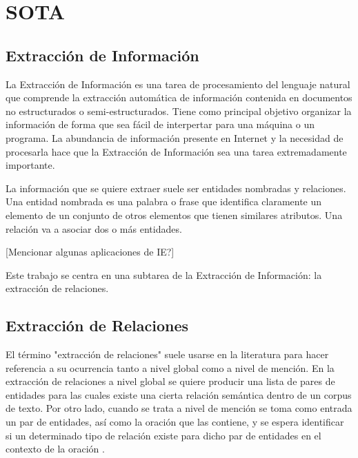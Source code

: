 
\chapter{SOTA}
\section{Extracción de Información}

La Extracción de Información es una tarea de procesamiento del lenguaje natural que comprende la extracción automática de información contenida en documentos no estructurados o semi-estructurados. Tiene como principal objetivo organizar la información de forma que sea fácil de interpertar para una máquina o un programa. La abundancia de información presente en Internet y la necesidad de procesarla hace que la Extracción de Información sea una tarea extremadamente importante. 


La información que se quiere extraer suele ser entidades nombradas y relaciones. Una entidad nombrada es una palabra o frase que identifica claramente un elemento de un conjunto de otros elementos que tienen similares atributos. Una relación va a asociar dos o más entidades.  

[Mencionar algunas aplicaciones de IE?]


Este trabajo se centra en una subtarea de la Extracción de Información: la extracción de relaciones.

\section{Extracción de Relaciones} 

El término "extracción de relaciones" suele usarse en la literatura para hacer referencia a su ocurrencia tanto a nivel global como a nivel de mención. En la extracción de relaciones a nivel global se quiere producir una lista de pares de entidades para las cuales existe una cierta relación semántica dentro de un corpus de texto. Por otro lado, cuando se trata a nivel de mención se toma como entrada un par de entidades, así como la oración que las contiene, y se espera identificar si un determinado tipo de relación existe para dicho par de entidades en el contexto de la oración \cite{pawar2017survey}. 

